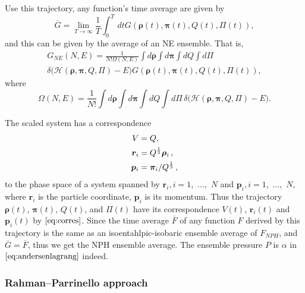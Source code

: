 Use this trajectory, any function's time average are given by
\begin{equation}
	\overline{G} = \lim_{T \rightarrow \infty} \frac{ 1 }{ T } \int_{0}^{T}  \, dt
	G(\bm{\rho}(t), \bm{\pi}(t), Q(t), \Pi(t)),
\end{equation}
and this can be given by the average of an NE ensemble. That is,
\begin{multline}
	G_{NE} (N, E) = \frac{ 1 }{ N! \Omega(N,E) } \int d\bm{\rho} \int d\bm{\pi}
	\int dQ \int d\Pi \\
	\delta \big( \mathcal{H}(\bm{\rho}, \bm{\pi}, Q, \Pi)
	- E \big) G(\bm{\rho}(t), \bm{\pi}(t), Q(t), \Pi(t)),
\end{multline}
where
\begin{equation}
	\Omega(N, E) = \frac{ 1 }{ N! }  \int d\bm{\rho} \int d\bm{\pi}
	\int dQ \int d\Pi \, \delta \big( \mathcal{H}(\bm{\rho}, \bm{\pi}, Q, \Pi)
	- E \big).
\end{equation}

The scaled system has a correspondence
\begin{align}\label{eq:corres}
	V        & = Q,                                           \\
	\bm{r}_i & = Q^{\frac{ 1 }{ 3 }} \bm{\rho}_i \thinspace,  \\
	\bm{p}_i & = \bm{\pi}_i / Q^{\frac{ 1 }{ 3 }} \thinspace,
\end{align}
to the phase space of a system spanned by
$\bm{r}_i, i=1$,~$\ldots$,~$N$ and
$\bm{p}_i, i=1$,~$\ldots$,~$N$,
where $\bm{r}_i$ is the particle coordinate, $\bm{p}_i$ is its momentum.
Thus the trajectory
$\bm{\rho}(t)$, $\bm{\pi}(t)$, $Q(t)$, and $\Pi(t)$ have its
correspondence $V(t)$, $\bm{r}_i(t)$ and $\bm{p}_i(t)$ by
$\eqref{eq:corres}$.
Since the time average $\overline{F}$ of any function $F$
derived by this trajectory is the same as an
isoentahlpic-isobaric ensemble average of $F_{NPH}$, and
$\overline{G} = \overline{F}$, thus we get the NPH ensemble average.
The ensemble pressure $P$ is $\alpha$ in $\eqref{eq:andersenlagrang}$ indeed.


\subsubsection{Rahman--Parrinello approach}
\label{sssec:rpa}

